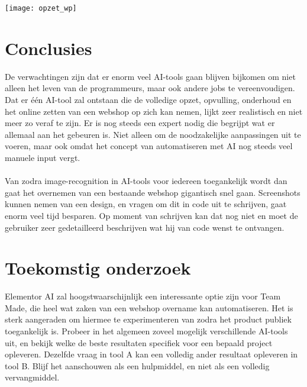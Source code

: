 \documentclass[a0,portrait]{hogent-poster}
\begin{document}
\begin{multicols}{2}
%
%
\begin{center}
  \captionsetup{type=figure}
  \texttt{[image: opzet\_wp]}
\end{center}
%

\section{Conclusies}
De verwachtingen zijn dat er enorm veel AI-tools gaan blijven bijkomen om niet alleen het leven van de programmeurs, maar ook andere jobs te vereenvoudigen.
Dat er één AI-tool zal ontstaan die de volledige opzet, opvulling, onderhoud en het online zetten van een webshop op zich kan nemen, lijkt zeer realistisch en niet meer zo veraf te zijn. Er is nog steeds een expert nodig die begrijpt wat er allemaal aan het gebeuren is. Niet alleen om de noodzakelijke aanpassingen uit te voeren, maar ook omdat het concept van automatiseren met AI nog steeds veel manuele input vergt.
\\\\
Van zodra image-recognition in AI-tools voor iedereen toegankelijk wordt dan gaat het overnemen van een bestaande webshop gigantisch snel gaan. Screenshots
kunnen nemen van een design, en vragen om dit in code uit te schrijven, gaat enorm veel tijd besparen. Op moment van schrijven kan dat nog niet en moet
de gebruiker zeer gedetailleerd beschrijven wat hij van code wenst te ontvangen.

\section{Toekomstig onderzoek}
Elementor AI zal hoogstwaarschijnlijk een interessante optie zijn voor Team Made, die heel wat zaken van een webshop overname kan automatiseren. Het is sterk aangeraden om hiermee te experimenteren van zodra het product publiek toegankelijk is. Probeer in het algemeen zoveel mogelijk verschillende AI-tools uit, en bekijk welke de beste resultaten specifiek voor een bepaald project opleveren. Dezelfde vraag in tool A kan een volledig ander resultaat opleveren in tool B. Blijf het aanschouwen als een hulpmiddel, en niet als een volledig vervangmiddel.
\end{multicols}
\end{document}
